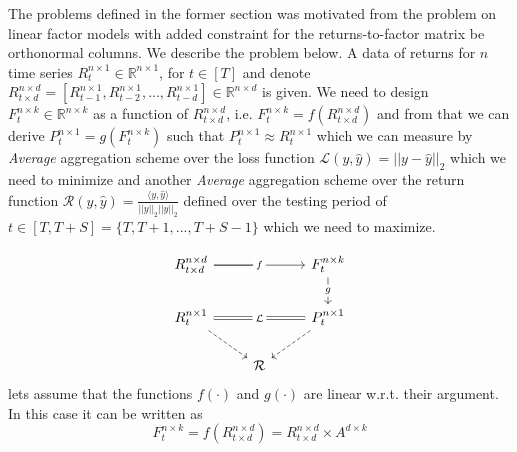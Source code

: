 {}

 \label{problem_linear_factor_model}
The problems defined in the former section was motivated from the problem on linear factor models with added constraint for the returns-to-factor matrix be orthonormal columns. We describe the problem below.\newline
\newline A data of returns for $n$ time series $R^{n\times 1}_t \in \mathbb{R}^{n\times 1}$, for $t\in [T]$ and denote $R^{n\times d}_{t\times d} = [R^{n\times 1}_{t-1},R^{n\times 1}_{t-2},...,R^{n\times 1}_{t-d}] \in \mathbb{R}^{n\times d}$ is given. 
\newline \newline We need to design $F^{n\times k}_t \in \mathbb{R}^{n\times k}$ as a function of $R^{n\times d}_{t\times d}$, i.e. $F^{n\times k}_t = f(R^{n\times d}_{t\times d})$ and from that we can derive $P^{n \times 1}_{t} = g(F^{n\times k}_t)$ such that $P^{n \times 1}_{t} \approx R^{n \times 1}_{t}$ which we can measure by \textit{Average} aggregation scheme over the loss function $\mathcal{L}(y,\hat{y}) = ||y-\hat{y}||_2$ which we need to minimize and another \textit{Average} aggregation scheme over the return function $\mathcal{R}(y,\hat{y}) = \frac{\langle y,\hat{y}\rangle}{||y||_2||\hat{y}||_2}$ defined over the testing period of $t \in [T,T+S]= \{T,T+1,...,T+S-1\}$ which we need to maximize.

\begin{equation} \label{lfm_diagram}
\begin{tikzcd}
R^{n\times d}_{t \times d} \arrow[rr, "f" description] \arrow[r, no head]& {}& F^{n\times k}_{t} \arrow[d, "g" description] \\
R^{n\times 1}_t \arrow[rr, "\mathcal{L}" description, Rightarrow, no head] \arrow[rd, dashed] && P^{n \times 1}_{t} \arrow[ld, dashed]\\
& \mathcal{R} &
\end{tikzcd}
\end{equation}
\newline
lets assume that the functions $f(\cdot)$ and $g(\cdot)$ are linear w.r.t. their argument. In this case it can be written as
\begin{equation} \label{f_for_lfm}
F^{n\times k}_t = f(R^{n\times d}_{t\times d}) = R^{n\times d}_{t\times d}\times A^{d\times k}
\end{equation}

